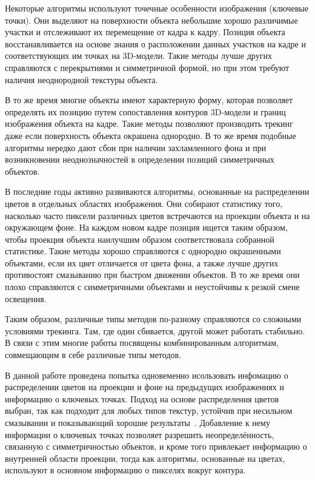 Некоторые алгоритмы\cite{Vacchetti2004,Lourakis2013,Pauwels2013}
используют точечные особенности изображения (ключевые точки).
Они выделяют на поверхности объекта небольшие хорошо различимые
участки\cite{AKAZE,SIFT,ShiAndTomasi} и отслеживают их перемещение от кадра
к кадру\cite{TomasiAndKanade,SIFT,PyrLK}.
Позиция объекта восстанавливается на основе знания о расположении данных
участков на кадре и соответствующих им точках на 3D-модели\cite{EPnP}.
Такие методы лучше других справляются с перекрытиями и симметричной формой,
но при этом требуют наличия неоднородной текстуры объекта.

В то же время многие объекты имеют характерную форму, которая позволяет
определять их позицию путем сопоставления контуров 3D-модели
и границ\cite{EdgesSurvey,CANNY} изображения объекта на кадре.
Такие методы\cite{RAPID,Marchand2003,Choi2012,Marchand2006,Klein2006,SeoHinterstoisser2014,WangZhong2015,Damen2012,VacchettiEdges2004}
позволяют производить трекинг даже если поверхность объекта окрашена однородно.
В то же время подобные алгоритмы нередко дают сбои при наличии захламленного
фона и при возникновении неоднозначностей в определении позиций
симметричных объектов.

В последние годы активно развиваются алгоритмы, основанные на
распределении цветов в отдельных областях
изображения\cite{PWP3D,Tjaden2017,Tjaden2018}.
Они собирают статистику того, насколько часто пиксели различных цветов
встречаются на проекции объекта и на окружающем фоне.
На каждом новом кадре позиция ищется таким образом, чтобы проекция объекта
наилучшим образом соответствовала собранной статистике.
Такие методы хорошо справляются с однородно окрашенными объектами, если их цвет
отличается от цвета фона, а также лучше других противостоят смазыванию при
быстром движении объектов.
В то же время они плохо справляются с симметричными объектами и неустойчивы к
резкой смене освещения.

Таким образом, различные типы методов по-разному справляются со сложными
условиями трекинга.
Там, где один сбивается, другой может работать стабильно.  В связи с этим
многие работы\cite{RegionPhotometric,ColorFeature2018,Bugaev_2018_ECCV}
посвящены комбинированным алгоритмам, совмещающим в себе различные типы
методов.


В данной работе проведена попытка одновеменно исользовать инфомацию о
распределении цветов на проекции и фоне на предыдущих изображениях и информацию
о ключевых точках.
Подход на основе распределения цветов выбран, так как подходит для любых типов
текстур, устойчив при несильном смазывании и показывающий хорошие
результаты~\cite{Tjaden2018}.
Добавление к нему информации о ключевых точках позволяет разрешить
неопределённость, связанную с симметричностью объектов, и кроме того привлекает
информацию о внутренней области проекции, тогда как алгоритмы, основанные на
цветах, используют в основном информацию о пикселях вокруг контура.


